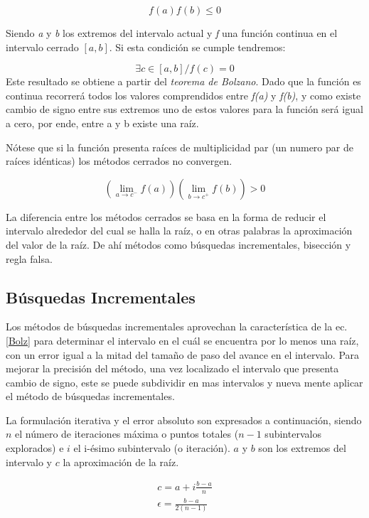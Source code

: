 \documentclass[letterpaper,10pt,oneside]{sphinxmanual}
\theoremstyle{plain}%
\theoremstyle{definition}%
\theoremstyle{remark}%
\begin{document}
\begin{equation}
 f(a)f(b)\leq 0 \label{Bolz}
\end{equation}

\noindent Siendo \textit{a} y \textit{b} los extremos del intervalo actual y \textit{f} una función continua en el intervalo cerrado $\left[a,b\right]$. Si esta condición se cumple tendremos:\medskip

\[ \exists c \in \left[ a,b \right]/f(c)=0 \]
Este resultado se obtiene a partir del \textit{teorema de Bolzano}. Dado que la función es continua
recorrerá todos los valores comprendidos entre \textit{f(a)} y \textit{f(b)}, y como existe cambio de signo
entre sus extremos uno de estos valores para la función será igual a cero, por ende, entre a y b
existe una raíz.\medskip

\noindent Nótese que si la función presenta raíces de multiplicidad par (un numero par de raíces
idénticas) los métodos cerrados no convergen.\medskip

\[ \left(\lim_{a \to c^{-}}f(a)\right)\left(\lim_{b \to c^{+}}f(b)\right)> 0  \]

\noindent La diferencia entre los métodos cerrados se basa en la forma de reducir el intervalo alrededor
del cual se halla la raíz, o en otras palabras la aproximación del valor de la raíz. De ahí métodos
como búsquedas incrementales, bisección y regla falsa.\noindent

\subsection{Búsquedas Incrementales}

\noindent Los métodos de búsquedas incrementales aprovechan la característica de la ec.\ref{Bolz} para determinar el intervalo en el cuál se encuentra por lo menos una raíz, con un error igual a la mitad del tamaño de paso del avance en el intervalo. Para mejorar la precisión del método, una vez localizado el intervalo que presenta cambio de signo, este se puede subdividir en mas intervalos y nueva mente aplicar el método de búsquedas incrementales.\medskip

\noindent La formulación iterativa y el error absoluto son expresados a continuación, siendo $n$ el número de iteraciones máxima o puntos totales ($n-1$ subintervalos explorados) e $i$ el i-ésimo subintervalo (o iteración). $a$ y $b$ son los extremos del intervalo y $c$ la aproximación de la raíz.\medskip

\begin{eqnarray}
 c=a+i\frac{b-a}{n} \label{bincr}\\
 \epsilon = \frac{b-a}{2(n-1)} \nonumber
\end{eqnarray}
\end{document}
